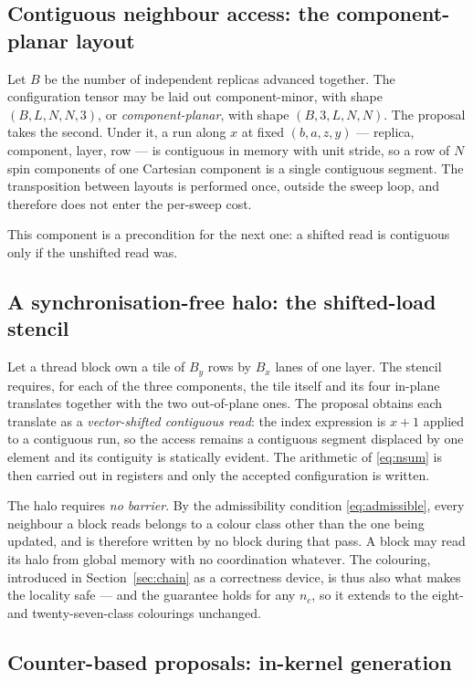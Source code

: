 \documentclass[11pt,a4paper]{article}
\begin{document}
\subsection{Contiguous neighbour access: the component-planar layout}
\label{sec:layout}

Let $B$ be the number of independent replicas advanced together. The
configuration tensor may be laid out component-minor, with shape
$(B, L, N, N, 3)$, or \emph{component-planar}, with shape $(B, 3, L, N, N)$. The
proposal takes the second. Under it, a run along $x$ at fixed $(b, a, z, y)$ ---
replica, component, layer, row --- is contiguous in memory with unit stride, so
a row of $N$ spin components of one Cartesian component is a single contiguous
segment. The transposition between layouts is performed once, outside the sweep
loop, and therefore does not enter the per-sweep cost.

This component is a precondition for the next one: a shifted read is contiguous
only if the unshifted read was.

\subsection{A synchronisation-free halo: the shifted-load stencil}
\label{sec:halo}

Let a thread block own a tile of $B_y$ rows by $B_x$ lanes of one layer. The
stencil requires, for each of the three components, the tile itself and its four
in-plane translates together with the two out-of-plane ones. The proposal
obtains each translate as a \emph{vector-shifted contiguous read}: the index
expression is $x + 1$ applied to a contiguous run, so the access remains a
contiguous segment displaced by one element and its contiguity is statically
evident. The arithmetic of \eqref{eq:nsum} is then carried out in registers and
only the accepted configuration is written.

The halo requires \emph{no barrier}. By the admissibility condition
\eqref{eq:admissible}, every neighbour a block reads belongs to a colour class
other than the one being updated, and is therefore written by no block during
that pass. A block may read its halo from global memory with no coordination
whatever. The colouring, introduced in Section~\ref{sec:chain} as a correctness
device, is thus also what makes the locality safe --- and the guarantee holds
for any $n_c$, so it extends to the eight- and twenty-seven-class colourings
unchanged.

\subsection{Counter-based proposals: in-kernel generation}
\label{sec:rng}
\end{document}
